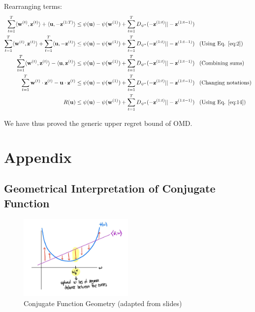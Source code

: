\documentclass[11pt]{article}
\begin{document}
{Rearranging terms:
\begin{align*}
 \sum_{t=1}^{T}\langle \textbf{w}^{(t)}, \textbf{z}^{(t)} \rangle + \langle \textbf{u}, -\textbf{z}^{(1:T)} \rangle &\leq \psi(\textbf{u}) -\psi(\textbf{w}^{(1)}) +\sum_{t=1}^{T} D_{\psi^{*}}(-\textbf{z}^{(1:t)}||-\textbf{z}^{(1:t-1)})\\
  \sum_{t=1}^{T}\langle \textbf{w}^{(t)}, \textbf{z}^{(t)} \rangle + \sum_{t=1}^{T}\langle \textbf{u}, -\textbf{z}^{(t)} \rangle &\leq \psi(\textbf{u}) -\psi(\textbf{w}^{(1)}) +\sum_{t=1}^{T} D_{\psi^{*}}(-\textbf{z}^{(1:t)}||-\textbf{z}^{(1:t-1)}) \;\;\; (\text{Using Eq. \ref{eq:2}})\\
  \sum_{t=1}^{T}\langle \textbf{w}^{(t)}, \textbf{z}^{(t)} \rangle - \langle \textbf{u}, \textbf{z}^{(t)} \rangle &\leq \psi(\textbf{u}) -\psi(\textbf{w}^{(1)}) +\sum_{t=1}^{T} D_{\psi^{*}}(-\textbf{z}^{(1:t)}||-\textbf{z}^{(1:t-1)}) \;\;\; (\text{Combining sums})\\
    \sum_{t=1}^{T}\textbf{w}^{(t)} \cdot \textbf{z}^{(t)} - \textbf{u} \cdot \textbf{z}^{(t)} &\leq \psi(\textbf{u}) -\psi(\textbf{w}^{(1)}) +\sum_{t=1}^{T} D_{\psi^{*}}(-\textbf{z}^{(1:t)}||-\textbf{z}^{(1:t-1)}) \;\;\; (\text{Changing notations})\\
    R(\textbf{u}) &\leq \psi(\textbf{u}) -\psi(\textbf{w}^{(1)}) +\sum_{t=1}^{T} D_{\psi^{*}}(-\textbf{z}^{(1:t)}||-\textbf{z}^{(1:t-1)}) \;\;\; (\text{Using Eq. \ref{eq:14}})\\
\end{align*}

We have thus proved the generic upper regret bound of OMD. 


}
\section{Appendix}

\subsection{Geometrical Interpretation of Conjugate Function}

\begin{figure}[H]
    \centering
    \includegraphics[width=0.5\textwidth]{figs/Page2.jpg}
    \caption{Conjugate Function Geometry (adapted from slides)}
    \label{fig:conj}
\end{figure}
\end{document}

